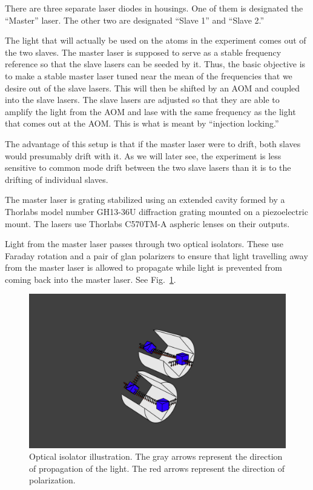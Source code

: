 There are three separate laser diodes in housings. One of them is designated the ``Master'' laser. The other two are designated ``Slave 1'' and ``Slave 2.'' 

The light that will actually be used on the atoms in the experiment comes out of the two slaves. The master laser is supposed to serve as a stable frequency reference so that the slave lasers can be seeded by it. Thus, the basic objective is to make a stable master laser tuned near the mean of the frequencies that we desire out of the slave lasers. This will then be shifted by an AOM and coupled into the slave lasers. The slave lasers are adjusted so that they are able to amplify the light from the AOM and lase with the same frequency as the light that comes out at the AOM. This is what is meant by ``injection locking.''

The advantage of this setup is that if the master laser were to drift, both slaves would presumably drift with it. As we will later see, the experiment is less sensitive to common mode drift between the two slave lasers than it is to the drifting of individual slaves.

The master laser is grating stabilized using an extended cavity formed by a Thorlabs model number GH13-36U  %
diffraction grating mounted on a piezoelectric mount. The lasers use Thorlabs C570TM-A aspheric lenses on their outputs. 

Light from the master laser passes through two optical isolators. These use Faraday rotation and a pair of glan polarizers to ensure that light travelling away from the master laser is allowed to propagate while light is prevented from coming back into the master laser. See Fig.~\ref{isolatorPicture}.

\begin{figure}
\label{isolatorPicture}
\centerline{\includegraphics[width=1\textwidth]{isolators}}
\caption[Optical Isolator Illustration]{Optical isolator illustration. The gray arrows represent the direction of propagation of the light. The red arrows represent the direction of polarization.}
\end{figure}

